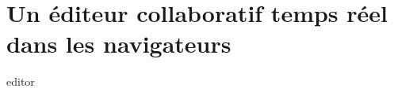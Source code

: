 \section{Un éditeur collaboratif temps réel dans les navigateurs}

\begin{frame}
  editor
\end{frame}

